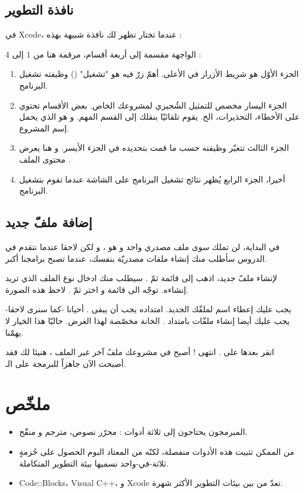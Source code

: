 \subsection{نافذة التطوير}

في
\textenglish{Xcode}،
عندما تختار
تظهر لك نافذة شبيهة بهذه :


الواجهة مقسمة إلى أربعة أقسام، مرقمة هنا من 1 إلى 4 :

\begin{enumerate}
  \item الجزء الأوّل هو شريط الأزرار في الأعلى. أهمّ زرّ فيه هو
"تشغيل"
()
وظيفته تشغيل البرنامج.
  \item الجزء اليسار مخصص للتمثيل الشُجيري لمشروعك الخاص. بعض الأقسام تحتوي على الأخطاء، التحذيرات، الخ. يقوم
تلقائيّا بنقلك إلى القسم المهم. و هو الذي يحمل إسم المشروع.
  \item الجزء الثالث تتغيّر وظيفته حسب ما قمت بتحديده في الجزء الأيسر. و هنا يعرض محتوى الملف
.
  \item أخيرا، الجزء الرابع يُظهر نتائج تشغيل البرنامج على الشاشة عندما تقوم بتشغيل البرنامج.
\end{enumerate}

\subsection{إضافة ملفّ جديد}

في البداية، لن تملك سوى ملف مصدري واحد و هو
،
و لكن لاحقا عندما نتقدم في الدروس سأطلب منك إنشاء ملفات مصدريّة بنفسك، عندما تصبح برامجنا أكبر.

لإنشاء ملفّ جديد، اذهب إلى قائمة
ثمّ
.
سيطلب منك ادخال نوع الملف الذي تريد إنشاءه. توجّه الى قائمة
و اختر
ثمّ
.
لاحظ هذه الصورة.


يجب عليك إعطاء اسم لملفّك الجديد. امتداده يجب أن يبقى
.
أحيانا -كما سنرى لاحقا- يجب عليك أيضا إنشاء ملفّات بامتداد
.
الخانة
مخصّصة لهذا الغرض. حاليّا هذا الخيار لا يهمّنا.

انقر بعدها على
.
انتهى ! أصبح في مشروعك ملفٌ آخر غير الملف
،
هنيئا لك فقد أصبحت الآن جاهزاً للبرمجة على الـ.

\section*{ملخّص}

\begin{itemize}
  \item المبرمجون يحتاجون إلى ثلاثة أدوات : محرّر نصوص، مترجم و منقّح.
  \item من الممكن تثبيت هذه الأدوات منفصلة، لكنّه من المعتاد البوم الحصول على حُزمةٍ ثلاثة-في-واحد نسميها بيئة التطوير المتكاملة.
  \item \textenglish{Code::Blocks}،
\textenglish{Visual C++}،
و
\textenglish{Xcode}
تعدّ من بين بيئات التطوير الأكثر شهرة.
\end{itemize}
